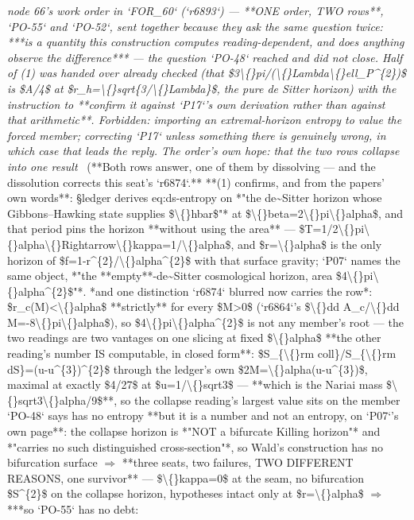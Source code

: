 \begin{description}
\textit{node 66's work order in `FOR\_60` (`r6893`) --- **ONE order, TWO rows**, `PO-55` and `PO-52`, sent together because they ask the same question twice: ***is a quantity this construction computes reading-dependent, and does anything observe the difference*** --- the question `PO-48` reached and did not close. Half of (1) was handed over already checked (that \$3\textbackslash\{\}pi/(\textbackslash\{\}Lambda\textbackslash\{\}ell\_P\textasciicircum{}\{2\})\$ is \$A/4\$ at \$r\_h=\textbackslash\{\}sqrt\{3/\textbackslash\{\}Lambda\}\$, the pure de Sitter horizon) with the instruction to **confirm it against `P17`'s own derivation rather than against that arithmetic**. Forbidden: importing an extremal-horizon entropy to value the forced member; correcting `P17` unless something there is genuinely wrong, in which case that leads the reply. The order's own hope: that the two rows collapse into one result} \ (**Both rows answer, one of them by dissolving --- and the dissolution corrects this seat's `r6874`.**  **(1) confirms, and from the papers' own words**: \S{}ledger derives eq:ds-entropy on *"the de\textasciitilde{}Sitter horizon whose Gibbons--Hawking state supplies \$\textbackslash\{\}hbar\$"* at \$\textbackslash\{\}beta=2\textbackslash\{\}pi\textbackslash\{\}alpha\$, and that period pins the horizon **without using the area** --- \$T=1/2\textbackslash\{\}pi\textbackslash\{\}alpha\textbackslash\{\}Rightarrow\textbackslash\{\}kappa=1/\textbackslash\{\}alpha\$, and \$r=\textbackslash\{\}alpha\$ is the only horizon of \$f=1-r\textasciicircum{}\{2\}/\textbackslash\{\}alpha\textasciicircum{}\{2\}\$ with that surface gravity; `P07` names the same object, *"the **empty**-de\textasciitilde{}Sitter cosmological horizon, area \$4\textbackslash\{\}pi\textbackslash\{\}alpha\textasciicircum{}\{2\}\$"*.   *and one distinction `r6874` blurred now carries the row*: \$r\_c(M)<\textbackslash\{\}alpha\$ **strictly** for every \$M>0\$ (`r6864`'s \$\textbackslash\{\}dd A\_c/\textbackslash\{\}dd M=-8\textbackslash\{\}pi\textbackslash\{\}alpha\$), so \$4\textbackslash\{\}pi\textbackslash\{\}alpha\textasciicircum{}\{2\}\$ is not any member's root --- the two readings are two vantages on one slicing at fixed \$\textbackslash\{\}alpha\$  **the other reading's number IS computable, in closed form**: \$S\_\{\textbackslash\{\}rm coll\}/S\_\{\textbackslash\{\}rm dS\}=(u-u\textasciicircum{}\{3\})\textasciicircum{}\{2\}\$ through the ledger's own \$2M=\textbackslash\{\}alpha(u-u\textasciicircum{}\{3\})\$, maximal at exactly \$4/27\$ at \$u=1/\textbackslash\{\}sqrt3\$ --- **which is the Nariai mass \$\textbackslash\{\}sqrt3\textbackslash\{\}alpha/9\$**, so the collapse reading's largest value sits on the member `PO-48` says has no entropy   **but it is a number and not an entropy, on `P07`'s own page**: the collapse horizon is *"NOT a bifurcate Killing horizon"* and *"carries no such distinguished cross-section"*, so Wald's construction has no bifurcation surface \ensuremath{\Rightarrow}  **three seats, two failures, TWO DIFFERENT REASONS, one survivor** --- \$\textbackslash\{\}kappa=0\$ at the seam, no bifurcation \$S\textasciicircum{}\{2\}\$ on the collapse horizon, hypotheses intact only at \$r=\textbackslash\{\}alpha\$ \ensuremath{\Rightarrow}  ***so `PO-55` has no debt: 
\end{description}
